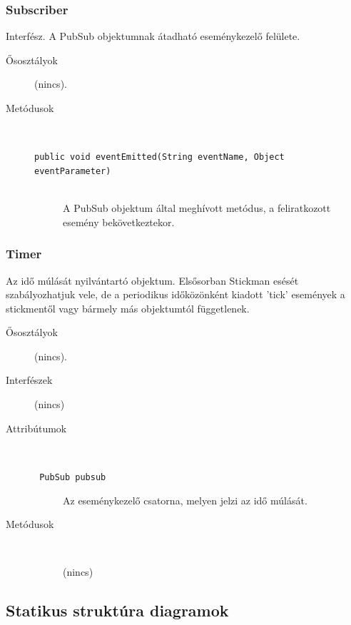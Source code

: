 		\subsubsection{Subscriber} Interfész.
				 A PubSub objektumnak átadható eseménykezelő felülete. 			\begin{description}


				\item[Ősosztályok] (nincs).
				\item[Metódusok]$\ $
					\begin{description}
						\item[\texttt{public void eventEmitted(String eventName, Object eventParameter)}] \hfill \\ A PubSub objektum által meghívott metódus,  a feliratkozott esemény bekövetkeztekor. 
					\end{description}
			\end{description}

		\subsubsection{Timer}
				 Az idő múlását nyilvántartó objektum.   Elsősorban Stickman esését szabályozhatjuk vele, de a  periodikus időközönként kiadott 'tick' események  a stickmentől vagy bármely más objektumtól függetlenek.  			\begin{description}


				\item[Ősosztályok] (nincs).
				\item[Interfészek] (nincs)
				\item[Attribútumok]$\ $
					\begin{description}
						\item[\texttt{ PubSub pubsub}] Az eseménykezelő csatorna,  melyen jelzi az idő múlását. 
					\end{description}
				\item[Metódusok]$\ $
					\begin{description}
						\item[] (nincs)
					\end{description}
			\end{description}


	\subsection{Statikus struktúra diagramok}

